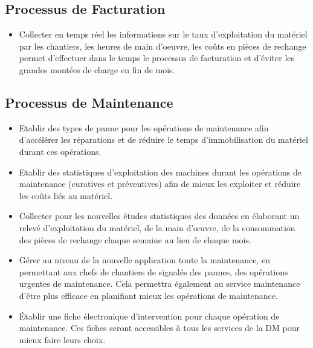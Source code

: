         \subsection{Processus de Facturation}
        \begin{itemize}
                \item Collecter en temps réel les informations sur le taux d'exploitation du matériel par les chantiers, les heures de main d'oeuvre, les coûts en pièces de rechange permet d'effectuer dans le temps le processus de facturation et d'éviter les grandes montées de charge en fin de mois.
        \end{itemize}

        \subsection{Processus de Maintenance}
        \begin{itemize}
                \item Etablir des types de panne pour les opérations de maintenance afin d'accélérer les réparations et de réduire le temps d'immobilisation du matériel durant ces opérations.
                \item Etablir des statistiques d'exploitation des machines durant les opérations de maintenance (curatives et préventives) afin de mieux les exploiter et réduire les coûts liés au matériel.
                \item Collecter pour les nouvelles études statistiques des données en élaborant un relevé d'exploitation du matériel, de la main d'œuvre, de la consommation des pièces de rechange chaque semaine au lieu de chaque mois.
                \item Gérer au niveau de la nouvelle application toute la maintenance, en permettant aux chefs de chantiers de signalés des pannes, des opérations urgentes de maintenance. Cela permettra également au service maintenance d'être plus efficace en planifiant mieux les opérations de maintenance.
                \item Établir une fiche électronique d'intervention pour chaque opération de maintenance. Ces fiches seront accessibles à tous les services de la DM pour mieux faire leurs choix.
        \end{itemize}

